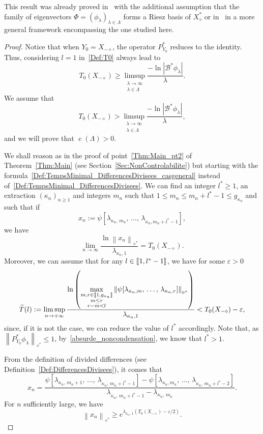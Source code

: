 \documentclass[10pt]{amsart}
\theoremstyle{definition}\newtheorem{defi}[theo]{Definition}\newtheorem{rema}[theo]{Remark}\newtheorem{exam}[theo]{Example}\newtheorem{exem}[theo]{Example}\newtheorem{nota}[theo]{Notation}
\newcommand{\llbracket}{\mathopen{[\mkern -2.7mu[}}
\newcommand{\rrbracket}{\mathclose{]\mkern -2.7mu]}}
\newcommand{\inter}[2]{\llbracket #1,#2 \rrbracket}
\newcommand\Bs{\mathcal{B}^*}
\newcommand{\Xalphas}{X_\diamond^*}
\newcommand{\Xmalpha}{X_{-\diamond}}
\newcommand{\Fzp}{Y_0}
\newcommand{\normeXalphas}[1]{\left\| #1 \right\|_{\diamond^*}}
\newcommand{\PFa}{P_{\Fzp}^*}
\newcommand{\n}{g}
\DeclareMathOperator{\cond}{c}
\begin{document}
This result was already proved in~\cite{AmmarKhodjaBenabdallahGonzalez-BurgosdeTeresa:2014} with the additional assumption that the family of eigenvectors $\Phi=(\phi_\lambda)_{\lambda \in \Lambda}$ forms a Riesz basis of $\Xalphas$ or in~\cite[Remark~1.15]{AKBGBM_2018} in a more general framework encompassing the one studied here.
\begin{proof}
Notice that when $\Fzp = \Xmalpha$, the operator $\PFa$ reduces to the identity. Thus, considering $l=1$ in~\eqref{Def:T0} always lead to
\[
T_{0}(\Xmalpha) \geq \limsup_{\substack{\lambda\to \infty\\ \lambda\in \Lambda}} \frac{-\ln \left| \Bs \phi_\lambda \right|}{\lambda}.
\]
We assume that
\begin{equation}\label{absurde_noncondensation}
T_{0}(\Xmalpha)>\limsup_{\substack{\lambda\to \infty\\ \lambda\in \Lambda}} \frac{-\ln \left| \Bs \phi_\lambda \right|}{\lambda},
\end{equation}
and we will prove that $\cond(\Lambda)>0$.

We shall reason as in the proof of point~\eqref{Thm:Main_pt2} of Theorem~\ref{Thm:Main} (see Section~\ref{Sec:NonControlabilite}) but starting with the formula~\eqref{Def:TempsMinimal_DifferencesDivisees_casgeneral} instead of~\eqref{Def:TempsMinimal_DifferencesDivisees}. We can find an integer $l^*\geq 1$, an extraction $(\kappa_n)_{n \geq 1}$ and integers $m_n$ such that $1\leq m_n\leq m_n+l^*-1\leq \n_{\kappa_n}$ and such that if
\[
x_n := \psi[\lambda_{\kappa_n,\,m_n},\,\dots,\, \lambda_{\kappa_n,m_n+l^*-1}],
\]
we have
\begin{equation*}\label{prop_ynbis}
\lim_{n \to \infty} \frac{\ln \normeXalphas{ x_n }}{\lambda_{\kappa_n,1}} = T_0(\Xmalpha).
\end{equation*}
Moreover, we can assume that for any $l \in \inter{1}{l^*-1}$, we have for some $\varepsilon>0$
\[
\widetilde{T}(l) := \limsup_{n \to + \infty} \frac{\ln \left(\max\limits_{\substack{m,r \in \inter{1}{\n_{\kappa_n}}\\ m\leq r \\ r-m < l} } \normeXalphas{ \psi[\lambda_{\kappa_n,m},\,\dots,\, \lambda_{\kappa_n,r}] } \right)}{\lambda_{\kappa_n,1}} < T_0(\Xmalpha)-\varepsilon,
\]
since, if it is not the case, we can reduce the value of $l^*$ accordingly. Note that, as $\normeXalphas{ \PFa \phi_\lambda } \leq 1$, by~\eqref{absurde_noncondensation}, we know that $l^*>1$.

From the definition of divided differences (see Definition~\ref{Def:DifferencesDivisees}), it comes that
\[
x_n = \frac{\psi[\lambda_{\kappa_n,\,m_n+1},\,\dots,\,\lambda_{\kappa_n,\,m_n+l^*-1}]-\psi[\lambda_{\kappa_n,m_n},\,\dots,\,\lambda_{\kappa_n,\,m_n+l^*-2}]}{\lambda_{\kappa_n,\,m_n+l^*-1}-\lambda_{\kappa_n,\,m_n}}.
\]
For $n$ sufficiently large, we have
\[
\normeXalphas{ x_n } \geq e^{\lambda_{\kappa_n,\,1} (T_0(\Xmalpha)-\varepsilon/2)}.
\]


\end{proof}
\end{document}
